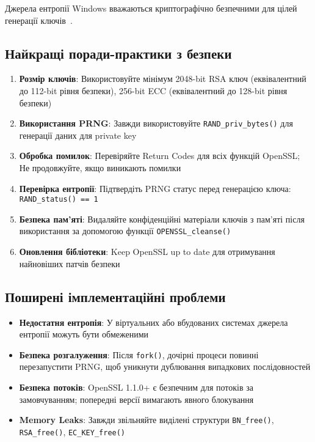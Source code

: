Джерела ентропії Windows вважаються криптографічно безпечними для цілей генерації ключів~\cite{gutmann1998software}.

\subsection{Найкращі поради-практики з безпеки}
\begin{enumerate}
    \item \textbf{Розмір ключів}: Використовуйте мінімум 2048-bit RSA ключ (еквівалентний до 112-bit рівня безпеки), 
        256-bit ECC (еквівалентний до 128-bit рівня безпеки)~\cite{barker2020recommendation}
    \item \textbf{Використання PRNG}: Завжди використовуйте \texttt{RAND\_priv\_bytes()} для генерації даних для private key
    \item \textbf{Обробка помилок}: Перевіряйте Return Codes для всіх функцій OpenSSL; Не продовжуйте, якщо виникають помилки
    \item \textbf{Перевірка ентропії}: Підтвердіть PRNG статус перед генерацією ключа: \texttt{RAND\_status() == 1}
    \item \textbf{Безпека пам'яті}: Видаляйте конфіденційні матеріали ключів з пам'яті після використання за допомогою 
        функції \texttt{OPENSSL\_cleanse()}
    \item \textbf{Оновлення бібліотеки}: Keep OpenSSL up to date для отримування найновіших патчів безпеки
\end{enumerate}

\subsection{Поширені імплементаційні проблеми}
\begin{itemize}
    \item \textbf{Недостатня ентропія}: У віртуальних або вбудованих системах джерела ентропії можуть бути обмеженими
    \item \textbf{Безпека розгалуження}: Після \texttt{fork()}, дочірні процеси повинні перезапустити PRNG, щоб уникнути 
        дублювання випадкових послідовностей
    \item \textbf{Безпека потоків}: OpenSSL 1.1.0+ є безпечним для потоків за замовчуванням; попередні версії 
        вимагають явного блокування
    \item \textbf{Memory Leaks}: Завжди звільняйте виділені структури \texttt{BN\_free()}, \texttt{RSA\_free()}, \texttt{EC\_KEY\_free()}
\end{itemize}

